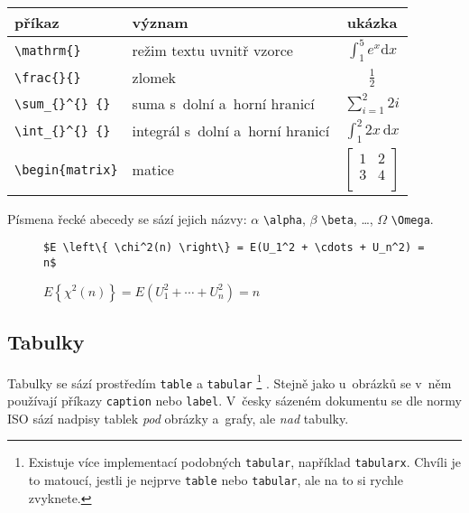 \begin{table}[ht]
\centering
\begin{tabular}{|l|l|c|}
příkaz & význam & ukázka \\
\hline \hline
\verb|\mathrm{}| & režim textu uvnitř vzorce & $\int_1^5 e^x \mathrm{d}x$ \\
\verb|\frac{}{}| & zlomek & $\frac{1}{2}$ \\
\verb|\sum_{}^{} {}| & suma s~dolní a~horní hranicí & $\sum_{i=1}^{2} 2i$ \\
\verb|\int_{}^{} {}| & integrál s~dolní a~horní hranicí & $\int_{1}^{2} 2x \, \mathrm{d}x$ \\
\verb|\begin{matrix}| & matice & $\left[ \begin{matrix}
1 & 2 \\
3 & 4 \\
\end{matrix} \right]$ \\
\end{tabular}
\end{table}

Písmena řecké abecedy se sází jejich názvy: $\alpha$ \verb|\alpha|, $\beta$ \verb|\beta|, \dots, $\Omega$ \verb|\Omega|.

\begin{figure}[ht]
\begin{mdframed}
\onehalfspacing
\begin{verbatim}
$E \left\{ \chi^2(n) \right\} = E(U_1^2 + \cdots + U_n^2) = n$
\end{verbatim}

$E \left\{ \chi^2(n) \right\} = E(U_1^2 + \cdots + U_n^2) = n$
\end{mdframed}
\end{figure}
\FloatBarrier

\subsection{Tabulky}

Tabulky se sází prostředím \texttt{table} a \texttt{tabular}%
\footnote{
    Existuje více implementací podobných \texttt{tabular}, například \texttt{tabularx}.
    Chvíli je to matoucí, jestli je nejprve \texttt{table} nebo \texttt{tabular}, ale na to si rychle zvyknete.
}%
.
Stejně jako u~obrázků se v~něm používají příkazy \texttt{caption} nebo \texttt{label}.
V~česky sázeném dokumentu se dle normy ISO sází nadpisy tablek \emph{pod} obrázky a~grafy, ale \emph{nad} tabulky.

